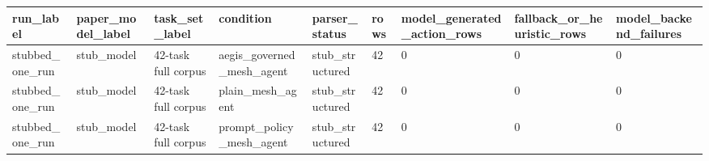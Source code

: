 \begin{tabular}{lllllllll}
 \hline
run\_label & paper\_model\_label & task\_set\_label & condition & parser\_status & rows & model\_generated\_action\_rows & fallback\_or\_heuristic\_rows & model\_backend\_failures \\
 \hline
stubbed\_one\_run & stub\_model & 42-task full corpus & aegis\_governed\_mesh\_agent & stub\_structured & 42 & 0 & 0 & 0 \\
stubbed\_one\_run & stub\_model & 42-task full corpus & plain\_mesh\_agent & stub\_structured & 42 & 0 & 0 & 0 \\
stubbed\_one\_run & stub\_model & 42-task full corpus & prompt\_policy\_mesh\_agent & stub\_structured & 42 & 0 & 0 & 0 \\
 \hline
\end{tabular}
